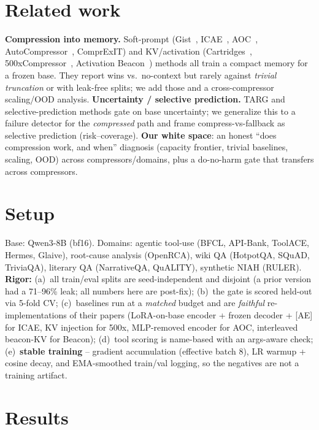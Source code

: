 \documentclass[11pt]{article}
\begin{document}
\section{Related work}
\textbf{Compression into memory.} Soft-prompt (Gist~\cite{gist}, ICAE~\cite{icae}, AOC~\cite{aoc},
AutoCompressor~\cite{autocompressor}, ComprExIT) and KV/activation (Cartridges~\cite{cartridges},
500xCompressor~\cite{x500}, Activation Beacon~\cite{beacon}) methods all train a compact memory for a frozen
base. They report wins vs.\ no-context but rarely against \emph{trivial truncation} or with leak-free splits;
we add those and a cross-compressor scaling/OOD analysis. \textbf{Uncertainty / selective prediction.} TARG and
selective-prediction methods gate on base uncertainty; we generalize this to a failure detector for the
\emph{compressed} path and frame compress-vs-fallback as selective prediction (risk--coverage). \textbf{Our
white space}: an honest ``does compression work, and when'' diagnosis (capacity frontier, trivial baselines,
scaling, OOD) across compressors/domains, plus a do-no-harm gate that transfers across compressors.

\section{Setup}\label{sec:setup}
Base: Qwen3-8B (bf16). Domains: agentic tool-use (BFCL, API-Bank, ToolACE, Hermes, Glaive), root-cause analysis
(OpenRCA), wiki QA (HotpotQA, SQuAD, TriviaQA), literary QA (NarrativeQA, QuALITY), synthetic NIAH (RULER).
\textbf{Rigor:} (a)~all train/eval splits are seed-independent and disjoint (a prior version had a 71--96\%
leak; all numbers here are post-fix); (b)~the gate is scored held-out via 5-fold CV; (c)~baselines run at a
\emph{matched} budget and are \emph{faithful} re-implementations of their papers (LoRA-on-base encoder + frozen
decoder + [AE] for ICAE, KV injection for 500x, MLP-removed encoder for AOC, interleaved beacon-KV for Beacon);
(d)~tool scoring is name-based with an args-aware check; (e)~\textbf{stable training} -- gradient accumulation
(effective batch $8$), LR warmup + cosine decay, and EMA-smoothed train/val logging, so the negatives are not a
training artifact.

\section{Results}
\end{document}
